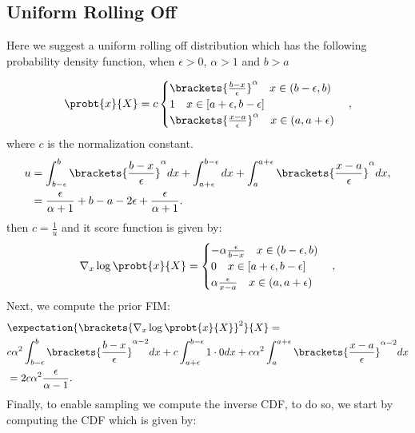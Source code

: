 \subsection{Uniform Rolling Off}
Here we suggest a uniform rolling off distribution which has the following probability density function, when $\epsilon>0$, $\alpha>1$ and $b>a$

\begin{align}
    \probt{x}{X}=c\begin{cases}
                        \brackets{\frac{b-x}{\epsilon}}^{\alpha}\quad x\in (b-\epsilon,b)\\
                        1\quad x\in [a+\epsilon,b-\epsilon] \\
                        \brackets{\frac{x-a}{\epsilon}}^{\alpha}\quad x \in (a,a+\epsilon)
    \end{cases},
\end{align}
where $c$ is the normalization constant. 
\begin{align}
    u&=\int_{b-\epsilon}^{b}\brackets{\frac{b-x}{\epsilon}}^{\alpha}dx+\int_{a+\epsilon}^{b-\epsilon}dx +\int_{a}^{a+\epsilon}\brackets{\frac{x-a}{\epsilon}}^{\alpha}dx,\nonumber\\
     &=\frac{\epsilon}{\alpha+1}+b-a-2\epsilon+\frac{\epsilon}{\alpha+1}.
\end{align}
then $c=\frac{1}{u}$ and it score function is given by:
\begin{align}
    \nabla_{x}\log\probt{x}{X}=\begin{cases}
                        -\alpha\frac{\epsilon}{b-x}\quad x\in (b-\epsilon,b)\\
                        0\quad x\in [a+\epsilon,b-\epsilon] \\
                        \alpha\frac{\epsilon }{x-a}\quad x \in (a,a+\epsilon)
    \end{cases},
\end{align}
Next, we compute the prior FIM:
\begin{align}
    &\expectation{\brackets{\nabla_{x}\log\probt{x}{X}}^2}{X} =\\
    &c\alpha^{2}\int_{b-\epsilon}^{b}\brackets{\frac{b-x}{\epsilon}}^{\alpha-2}dx+c\int_{a+\epsilon}^{b-\epsilon}1\cdot 0 dx +c\alpha^{2}\int_{a}^{a+\epsilon}\brackets{\frac{x-a}{\epsilon}}^{\alpha-2}dx\\
    &=2c\alpha^{2}\frac{\epsilon}{\alpha-1} .
\end{align}
Finally, to enable sampling we compute the inverse CDF, to do so, we start by computing the CDF which is given by:
